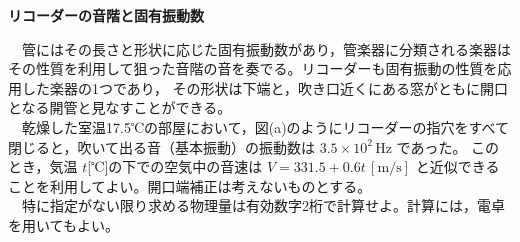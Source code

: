 \documentclass[a4paper,11pt]{ltjsarticle}
\newcommand{\banner}[1]{%
  \begin{tcolorbox}[colback=black,coltext=white,boxrule=0pt,sharp corners,
    left=8pt,right=8pt,top=5pt,bottom=5pt,before skip=8pt,after skip=8pt]
    {\Large\bfseries #1}
  \end{tcolorbox}}
\begin{document}
\banner{リコーダーの音階と固有振動数}

　管にはその長さと形状に応じた固有振動数があり，管楽器に分類される楽器はその性質を利用して狙った音階の音を奏でる。リコーダーも固有振動の性質を応用した楽器の1つであり，
その形状は下端と，吹き口近くにある窓がともに開口となる開管と見なすことができる。\\
　乾燥した室温17.5℃の部屋において，図(a)のようにリコーダーの指穴をすべて閉じると，吹いて出る音（基本振動）の振動数は $3.5\times10^{2}\,\mathrm{Hz}$ であった。
このとき，気温 $t$[℃]の下での空気中の音速は $V=331.5+0.6t\,[\mathrm{m/s}]$ と近似できることを利用してよい。開口端補正は考えないものとする。\\
　特に指定がない限り求める物理量は有効数字2桁で計算せよ。計算には，電卓を用いてもよい。
\end{document}
